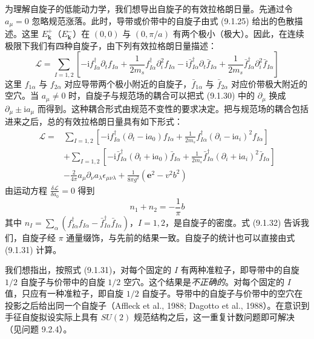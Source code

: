 为理解自旋子的低能动力学，我们想导出自旋子的有效拉格朗日量。先通过令 $a_{\mu}=0$ 忽略规范涨落。此时，导带或价带中的自旋子由式 (9.1.25) 给出的色散描述。这里 $E^+_{\pmb{k}}$（$E^-_{\pmb{k}}$）在 $(0,0)$ 与 $(0,\pi/a)$ 有两个极小（极大）。因此，在连续极限下我们有四种自旋子，由下列有效拉格朗日量描述：
\begin{equation*}
\mathcal{L}=\sum_{I=1,2}\left[-\mathrm{i}f^{\dagger}_{I\alpha}\partial_tf_{I\alpha}+\frac{1}{2m_s}f^{\dagger}_{I\alpha}\partial_i^2f_{I\alpha}-\mathrm{i}\bar{f}^{\dagger}_{I\alpha}\partial_t\bar{f}_{I\alpha}+\frac{1}{2m_s}\bar{f}^{\dagger}_{I\alpha}\partial_i^2\bar{f}_{I\alpha}\right]
\tag{9.1.30}
\end{equation*}
这里 $f_{1\alpha}$ 与 $f_{2\alpha}$ 对应导带两个极小附近的自旋子，$\bar{f}_{1\alpha}$ 与 $\bar{f}_{2\alpha}$ 对应价带极大附近的空穴。当 $a_{\mu}\neq0$ 时，自旋子与规范场的耦合可以把式 (9.1.30) 中的 $\partial_{\mu}$ 换成 $\partial_{\mu}\pm\mathrm{i}a_{\mu}$ 而得到。这种耦合形式由规范不变性的要求决定。把与规范场的耦合包括进来之后，总的有效拉格朗日量具有如下形式：
\begin{equation*}
\begin{aligned}
\mathcal{L}={}&\sum_{I=1,2}\left[-\mathrm{i}f^{\dagger}_{I\alpha}(\partial_t-\mathrm{i}a_0)f_{I\alpha}+\frac{1}{2m_s}f^{\dagger}_{I\alpha}(\partial_i-\mathrm{i}a_i)^2f_{I\alpha}\right]\\
&+\sum_{I=1,2}\left[-\mathrm{i}\bar{f}^{\dagger}_{I\alpha}(\partial_t+\mathrm{i}a_0)\bar{f}_{I\alpha}+\frac{1}{2m_s}\bar{f}^{\dagger}_{I\alpha}(\partial_i+\mathrm{i}a_i)^2\bar{f}_{I\alpha}\right]\\
&-\frac{2}{4\pi}a_{\mu}\partial_{\nu}a_{\lambda}\epsilon_{\mu\nu\lambda}+\frac{1}{8\pi g^2}(\mathbf{e}^2-v^2b^2)
\end{aligned}
\tag{9.1.31}
\end{equation*}
由运动方程 $\frac{\delta\mathcal{L}}{\delta a_0}=0$ 得到
\begin{equation*}
n_1+n_2=-\frac{1}{\pi}b
\tag{9.1.32}
\end{equation*}
其中 $n_I=\sum_{\alpha}(f^{\dagger}_{I\alpha}f_{I\alpha}-\bar{f}^{\dagger}_{I\alpha}\bar{f}_{I\alpha})$，$I=1,2$，是自旋子的密度。式 (9.1.32) 告诉我们，自旋子经 $\pi$ 通量缀饰，与先前的结果一致。自旋子的统计也可以直接由式 (9.1.31) 计算。

我们想指出，按照式 (9.1.31)，对每个固定的 $I$ 有两种准粒子，即导带中的自旋 $1/2$ 自旋子与价带中的自旋 $1/2$ 空穴。这个结果是\emph{不正确的}。对每个固定的 $I$ 值，只应有一种准粒子，即自旋 $1/2$ 自旋子。导带中的自旋子与价带中的空穴在投影之后给出同一个自旋子（Affleck et al., 1988; Dagotto et al., 1988）。在意识到手征自旋拟设实际上具有 $SU(2)$ 规范结构之后，这一重复计数问题即可解决（见问题 9.2.4）。

